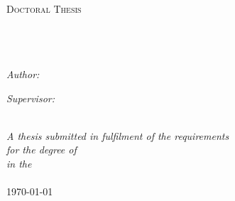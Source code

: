 \documentclass[11pt, oneside]{Thesis} %
\begin{document}
\begin{titlepage}
\begin{center}

\textsc{\LARGE \univname}\\[1.5cm] %
\textsc{\Large Doctoral Thesis}\\[0.5cm] %

\HRule \\[0.4cm] %
{\huge \bfseries \ttitle}\\[0.4cm] %
\HRule \\[1.5cm] %
 
\begin{minipage}{0.4\textwidth}
\begin{flushleft} \large
\emph{Author:}\\
\authornames %
\end{flushleft}
\end{minipage}
\begin{minipage}{0.4\textwidth}
\begin{flushright} \large
\emph{Supervisor:} \\
\supname %
\end{flushright}
\end{minipage}\\[3cm]
 
\large \textit{A thesis submitted in fulfilment of the requirements\\ for the degree of \degreename}\\[0.3cm] %
\textit{in the}\\[0.4cm]
\deptname\\[2cm] %
 
{\large \today}\\[4cm] %
 
\vfill
\end{center}

\end{titlepage}

\end{document}
